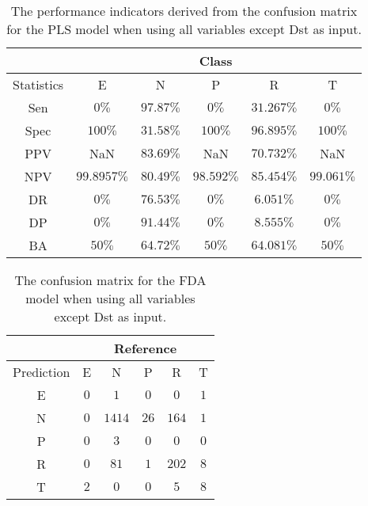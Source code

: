 \begin{table}[!ht]
	\centering
	\begin{tabular}{|c|c|c|c|c|c|}
		\hline
		 & \multicolumn{5}{c|}{Class} \\ \hline
		Statistics & E & N & P & R & T \\ \hline
		Sen & $0\%$ & $97.87\%$ & $0\%$ & $31.267\%$ & $0\%$ \\ \hline
		Spec & $100\%$ & $31.58\%$ & $100\%$ & $96.895\%$ & $100\%$ \\ \hline
		PPV & NaN & $83.69\%$ & NaN & $70.732\%$ & NaN \\ \hline
		NPV & $99.8957\%$ & $80.49\%$ & $98.592\%$ & $85.454\%$ & $99.061\%$ \\ \hline
		DR & $0\%$ & $76.53\%$ & $0\%$ & $6.051\%$ & $0\%$ \\ \hline
		DP & $0\%$ & $91.44\%$ & $0\%$ & $8.555\%$ & $0\%$ \\ \hline
		BA & $50\%$ & $64.72\%$ & $50\%$ & $64.081\%$ & $50\%$ \\ \hline
	\end{tabular}
	\caption{The performance indicators derived from the confusion matrix for the PLS model when using all variables except Dst as input.}
	\label{tab:cs:reverse:noDst:pls}
\end{table}

\begin{table}[!ht]
	\centering
	\begin{tabular}{|c|c|c|c|c|c|}
		\hline
		 & \multicolumn{5}{|c|}{Reference} \\ \hline
		 Prediction & E & N & P & R & T \\ \hline
		 E & $0$ & $1$ & $0$ & $0$ & $1$ \\ \hline
		 N & $0$ & $1414$ & $26$ & $164$ & $1$ \\ \hline
		 P & $0$ & $3$ & $0$ & $0$ & $0$ \\ \hline
		 R & $0$ & $81$ & $1$ & $202$ & $8$ \\ \hline
		 T & $2$ & $0$ & $0$ & $5$ & $8$ \\ \hline
	\end{tabular}
	\caption{The confusion matrix for the FDA model when using all variables except Dst as input.}
	\label{tab:cm:noDst:fda}
\end{table}

